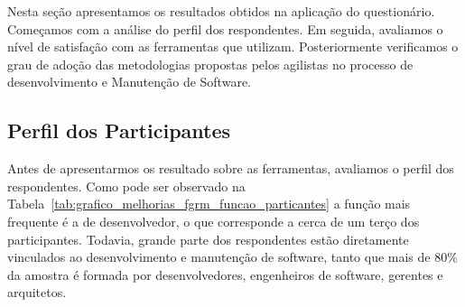 Nesta seção apresentamos os resultados obtidos na aplicação do questionário.
Começamos com a análise do perfil dos respondentes. Em seguida, avaliamos o
nível de satisfação com as ferramentas que utilizam. Posteriormente verificamos
o grau de adoção das metodologias propostas pelos agilistas no processo de
desenvolvimento e Manutenção de Software.

\subsection{Perfil dos Participantes}
\label{sub:pesquisa_prof_perfil_dos_participantes}

Antes de apresentarmos os resultado sobre as ferramentas, avaliamos o perfil dos
respondentes. Como pode ser observado na
Tabela~\ref{tab:grafico_melhorias_fgrm_funcao_particantes} a função mais
frequente é a de desenvolvedor, o que corresponde a cerca de um terço dos
participantes. Todavia, grande parte dos respondentes estão diretamente
vinculados ao desenvolvimento e manutenção de software, tanto que mais de 80\%
da amostra é formada por desenvolvedores, engenheiros de software, gerentes e
arquitetos.

\begin{table}[htpb]
\centering
{}
\caption{Função desempenhada pelos participantes}
\label{tab:grafico_melhorias_fgrm_funcao_particantes}
\end{table}

